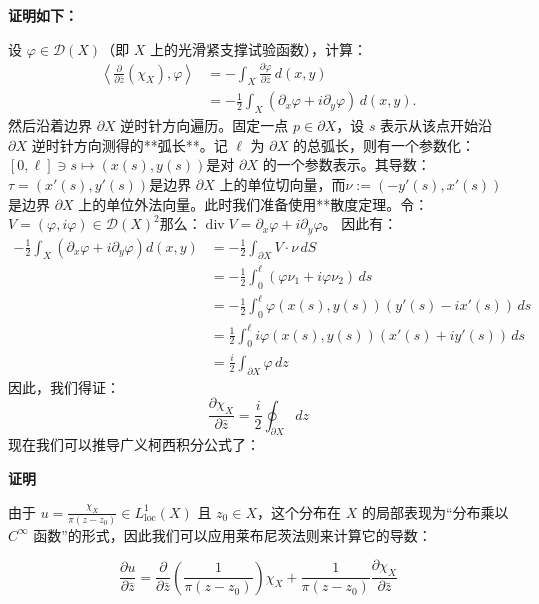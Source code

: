 \textbf{证明如下：}

设 $\varphi \in \mathcal{D}(X)$（即 $X$ 上的光滑紧支撑试验函数），计算：
$$
\begin{aligned}
\left\langle \frac{\partial}{\partial \bar{z}}(\chi_X), \varphi \right\rangle &= -\int_X \frac{\partial \varphi}{\partial \bar{z}}\, d(x,y) \\
&= -\frac{1}{2} \int_X \left( \partial_x \varphi + i \partial_y \varphi \right)\, d(x,y).
\end{aligned}~
$$
然后沿着边界 $\partial X$ 逆时针方向遍历。固定一点 $p \in \partial X$，设 $s$ 表示从该点开始沿 $\partial X$ 逆时针方向测得的**弧长**。记 $\ell$ 为 $\partial X$ 的总弧长，则有一个参数化：$[0, \ell] \ni s \mapsto (x(s), y(s))$是对 $\partial X$ 的一个参数表示。其导数：$\tau = \left( x'(s), y'(s) \right)$是边界 $\partial X$ 上的单位切向量，而$\nu := \left( -y'(s), x'(s) \right)$是边界 $\partial X$ 上的单位外法向量。此时我们准备使用**散度定理。令：$V = (\varphi, i\varphi) \in \mathcal{D}(X)^2$那么：$\operatorname{div} V = \partial_x \varphi + i \partial_y \varphi$。
因此有：
$$
\begin{aligned}
-\frac{1}{2} \int_X \left( \partial_x \varphi + i \partial_y \varphi \right) d(x,y)
&= -\frac{1}{2} \int_{\partial X} V \cdot \nu\, dS \\
&= -\frac{1}{2} \int_0^{\ell} \left( \varphi \nu_1 + i \varphi \nu_2 \right)\, ds \\
&= -\frac{1}{2} \int_0^{\ell} \varphi(x(s), y(s)) \left( y'(s) - i x'(s) \right)\, ds \\
&= \frac{1}{2} \int_0^{\ell} i \varphi(x(s), y(s)) \left( x'(s) + i y'(s) \right)\, ds \\
&= \frac{i}{2} \int_{\partial X} \varphi\, dz
\end{aligned}~
$$
因此，我们得证：
$$
\frac{\partial \chi_X}{\partial \bar{z}} = \frac{i}{2} \oint_{\partial X} dz~
$$
现在我们可以推导广义柯西积分公式了：

\textbf{证明}

由于
$u = \frac{\chi_X}{\pi(z - z_0)} \in L_{\text{loc}}^1(X)$
且 $z_0 \in X$，这个分布在 $X$ 的局部表现为“分布乘以 $C^\infty$ 函数”的形式，因此我们可以应用莱布尼茨法则来计算它的导数：

$$
\frac{\partial u}{\partial \bar{z}} = \frac{\partial}{\partial \bar{z}}\left( \frac{1}{\pi(z - z_0)} \right) \chi_X + \frac{1}{\pi(z - z_0)} \frac{\partial \chi_X}{\partial \bar{z}}~
$$


